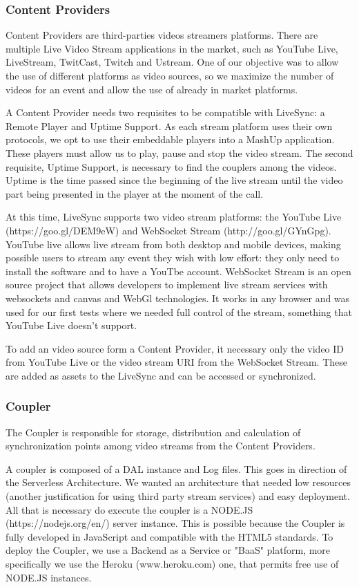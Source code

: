 \documentclass{sig-alternate-05-2015}
\begin{document}
\subsubsection{Content Providers}
Content Providers are third-parties videos streamers platforms. There are multiple Live Video Stream applications in the market, such as YouTube Live, LiveStream, TwitCast, Twitch and Ustream. One of our objective was to allow the use of different platforms as video sources, so we maximize the number of videos for an event and allow the use of already in market platforms. 

A Content Provider needs two requisites to be compatible with LiveSync: a Remote Player and Uptime Support. As each stream platform uses their own protocols, we opt to use their embeddable players into a MashUp application. These players must allow us to play, pause and stop the video stream. The second requisite, Uptime Support, is necessary to find the couplers among the videos. Uptime is the time passed since the beginning of the live stream until the video part being presented in the player at the moment of the call.

At this time, LiveSync supports two video stream platforms: the YouTube Live (https://goo.gl/DEM9eW) and WebSocket Stream (http://goo.gl/GYnGpg). YouTube live allows live stream from both desktop and mobile devices, making possible users to stream any event they wish with low effort: they only need to install the software and to have a YouTbe account. WebSocket Stream is an open source project that allows developers to implement live stream services with websockets and canvas and WebGl technologies. It works in any browser and was used for our first tests where we needed full control of the stream, something that YouTube Live doesn't support.

To add an video source form a Content Provider, it necessary only the video ID from YouTube Live or the video stream URI from the WebSocket Stream. These are added as assets to the LiveSync and can be accessed or synchronized.

\subsubsection{Coupler}
The Coupler is responsible for storage, distribution and calculation of synchronization points among video streams from the Content Providers.

A coupler is composed of a DAL instance and Log files. This goes in direction of the Serverless Architecture. We wanted an architecture that needed low resources (another justification for using third party stream services) and easy deployment. All that is necessary do execute the coupler is a NODE.JS (https://nodejs.org/en/) server instance. This is possible because the Coupler is fully developed in JavaScript and compatible with the HTML5 standards. To deploy the Coupler, we use a Backend as a Service or "BaaS" platform, more specifically we use the Heroku (www.heroku.com) one, that permits free use of NODE.JS instances.
\end{document}
